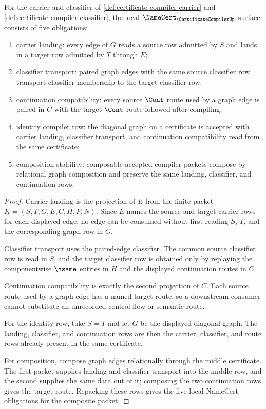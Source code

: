 \begin{theorem}
\label{thm:certificate-compiler-namecert-obligations}
For the carrier and classifier of
\autoref{def:certificate-compiler-carrier} and
\autoref{def:certificate-compiler-classifier}, the local
$\NameCert_{\CertificateCompilerUp}$ surface consists of five obligations:
\begin{enumerate}
\item carrier landing: every edge of $G$ reads a source row admitted by $S$
and lands in a target row admitted by $T$ through $E$;
\item classifier transport: paired graph edges with the same source
classifier row transport classifier membership to the target classifier row;
\item continuation compatibility: every source $\Cont$ route used by a graph
edge is paired in $C$ with the target $\Cont$ route followed after compiling;
\item identity compiler row: the diagonal graph on a certificate is accepted
with carrier landing, classifier transport, and continuation compatibility
read from the same certificate;
\item composition stability: composable accepted compiler packets compose by
relational graph composition and preserve the same landing, classifier, and
continuation rows.
\end{enumerate}
\end{theorem}
\begin{proof}
Carrier landing is the projection of $E$ from the finite packet
$K=(S,T,G,E,C,H,P,N)$. Since $E$ names the source and target carrier rows for
each displayed edge, no edge can be consumed without first reading $S$, $T$,
and the corresponding graph row in $G$.

Classifier transport uses the paired-edge classifier. The common source
classifier row is read in $S$, and the target classifier row is obtained only
by replaying the componentwise $\hsame$ entries in $H$ and the displayed
continuation routes in $C$.

Continuation compatibility is exactly the second projection of $C$. Each
source route used by a graph edge has a named target route, so a downstream
consumer cannot substitute an unrecorded control-flow or semantic route.

For the identity row, take $S=T$ and let $G$ be the displayed diagonal graph.
The landing, classifier, and continuation rows are then the carrier,
classifier, and route rows already present in the same certificate.

For composition, compose graph edges relationally through the middle
certificate. The first packet supplies landing and classifier transport into
the middle row, and the second supplies the same data out of it; composing the
two continuation rows gives the target route. Repacking these rows gives the
five local NameCert obligations for the composite packet.
\end{proof}


